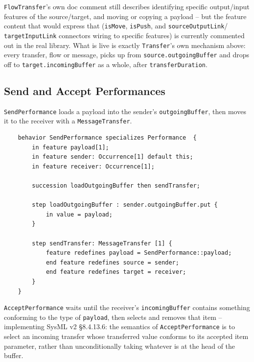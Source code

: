 \pn \texttt{FlowTransfer}'s own doc comment still describes identifying specific output/input
features of the source/target, and moving or copying a payload -- but the feature content that
would express that (\texttt{isMove}, \texttt{isPush}, and \texttt{sourceOutputLink}/
\texttt{targetInputLink} connectors wiring to specific features) is currently commented out in the
real library.  What is live is exactly \texttt{Transfer}'s own mechanism above: every transfer,
flow or message, picks up from \texttt{source.outgoingBuffer} and drops off to
\texttt{target.incomingBuffer} as a whole, after \texttt{transferDuration}.

\subsection{Send and Accept Performances}\label{subsec:sendaccept}

\pn \texttt{SendPerformance} loads a payload into the sender's \texttt{outgoingBuffer}, then moves
it to the receiver with a \texttt{MessageTransfer}.

\begin{lstlisting}
	behavior SendPerformance specializes Performance  {
		in feature payload[1];
		in feature sender: Occurrence[1] default this;
		in feature receiver: Occurrence[1];

		succession loadOutgoingBuffer then sendTransfer;

		step loadOutgoingBuffer : sender.outgoingBuffer.put {
			in value = payload;
		}

		step sendTransfer: MessageTransfer [1] {
			feature redefines payload = SendPerformance::payload;
			end feature redefines source = sender;
			end feature redefines target = receiver;
		}
	}
\end{lstlisting}

\pn \texttt{AcceptPerformance} waits until the receiver's \texttt{incomingBuffer} contains
something conforming to the type of \texttt{payload}, then selects and removes that item --
implementing SysML v2 \S8.4.13.6: the semantics of \texttt{AcceptPerformance} is to select an
incoming transfer whose transferred value conforms to its accepted item parameter, rather than
unconditionally taking whatever is at the head of the buffer.

